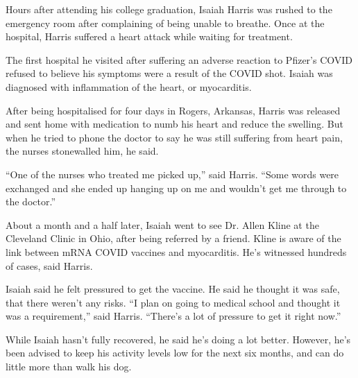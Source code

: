 Hours after attending his college graduation, Isaiah Harris was rushed to the
emergency room after complaining of being unable to breathe. Once at the
hospital, Harris suffered a heart attack while waiting for treatment.

The first hospital he visited after suffering an adverse reaction to Pfizer’s
COVID refused to believe his symptoms were a result of the COVID shot. Isaiah
was diagnosed with inflammation of the heart, or myocarditis.

After being hospitalised for four days in Rogers, Arkansas, Harris was released
and sent home with medication to numb his heart and reduce the swelling. But
when he tried to phone the doctor to say he was still suffering from heart pain,
the nurses stonewalled him, he said.

“One of the nurses who treated me picked up,” said Harris. “Some words were
exchanged and she ended up hanging up on me and wouldn’t get me through to the
doctor.”

About a month and a half later, Isaiah went to see Dr. Allen Kline at the
Cleveland Clinic in Ohio, after being referred by a friend. Kline is aware of
the link between mRNA COVID vaccines and myocarditis. He’s witnessed hundreds of
cases, said Harris.

Isaiah said he felt pressured to get the vaccine. He said he thought it was
safe, that there weren’t any risks. “I plan on going to medical school and
thought it was a requirement,” said Harris. “There’s a lot of pressure to get it
right now.”

While Isaiah hasn’t fully recovered, he said he’s doing a lot better. However,
he’s been advised to keep his activity levels low for the next six months, and
can do little more than walk his dog.

